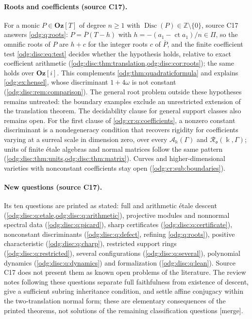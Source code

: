 \documentclass[11pt,oneside]{article}
\numberwithin{equation}{section}
\theoremstyle{definition}
\theoremstyle{remark}
\newcommand{\Oz}{\mathbf{Oz}}
\newcommand{\Z}{\mathbb Z}
\newcommand{\ct}{\operatorname{ct}}
\newcommand{\mergetag}{\textup{\textsf{\small[merge]}}}
\newcommand{\Og}{\Oz[i]}
\newcommand{\crA}{\mathcal A_\Bbbk(\Gamma)}
\newcommand{\Disc}{\operatorname{Disc}}
\begin{document}
\paragraph{Roots and coefficients (source C17).} For a monic $P\in\Oz[T]$ of degree $n\ge1$ with
$\Disc(P)\in\Z\setminus\{0\}$, source C17 answers \cref{odg:q:roots}: $P=\overline P(T-h)$
with $h=-(a_1-\ct a_1)/n\in\Pi$, so the omnific roots of $P$ are $h+c$ for the integer roots
$c$ of $\overline P$, and the finite coefficient test \eqref{odg:disc:eq:test} decides
whether the hypothesis holds, relative to exact coefficient arithmetic
(\cref{odg:disc:thm:translation,odg:disc:cor:roots}); the same holds over $\Og$. This
complements \cref{odg:thm:quadraticformula} and explains \cref{odg:ex:hensel}, whose
discriminant $1+4\omega$ is not constant (\cref{odg:disc:rem:comparison}). The general root
problem outside these hypotheses remains untreated: the boundary examples exclude an
unrestricted extension of the translation theorem. The decidability clause for general
support classes also remains open. For the first clause of
\cref{odg:cr:q:coefficients}, a nonzero constant discriminant is a nondegeneracy condition
that recovers rigidity for coefficients varying at a surreal scale in dimension zero, over
every $\crA$ and $\mathcal R_{\mathfrak o}(\Bbbk,\Gamma)$; units of finite \'etale algebras
and normal matrices follow the same pattern
(\cref{odg:disc:thm:units,odg:disc:thm:matrix}). Curves and higher-dimensional varieties
with nonconstant coefficients stay open (\cref{odg:cr:sub:boundaries}).

\paragraph{New questions (source C17).} Its ten questions are printed as stated: full and
arithmetic \'etale descent (\cref{odg:disc:q:etale,odg:disc:q:arithmetic}), projective modules
and nonnormal spectral data (\cref{odg:disc:q:picard}), sharp certificates
(\cref{odg:disc:q:certificate}), nonconstant discriminants (\cref{odg:disc:q:defect},
refining \cref{odg:q:roots}), positive characteristic (\cref{odg:disc:q:charp}), restricted
support rings (\cref{odg:disc:q:restricted}), several configurations
(\cref{odg:disc:q:several}), polynomial dynamics (\cref{odg:disc:q:dynamics}) and
formalization (\cref{odg:disc:q:lean}). Source C17 does not present them as known open
problems of the literature. The review notes following these questions separate full
faithfulness from existence of descent, give a sufficient subring inheritance condition,
and settle affine conjugacy within the two-translation normal form; these are elementary
consequences of the printed theorems, not solutions of the remaining classification
questions \mergetag.
\end{document}
